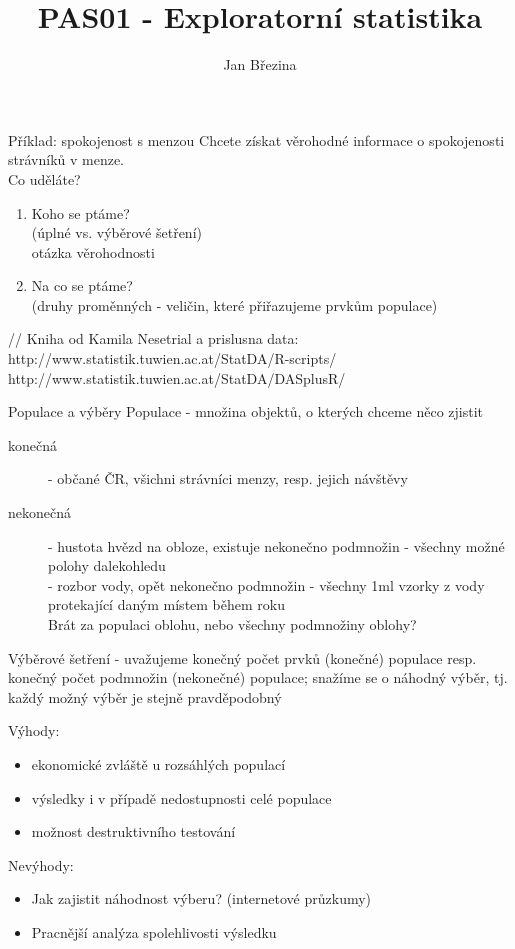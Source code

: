\documentclass[smaller]{beamer}
\title{PAS01 - Exploratorní statistika}
\author{Jan B\v rezina}
\institute %
{
  Technical University of Liberec
}
\def\blue#1{{\usebeamercolor[fg]{my blue} #1}}
\begin{document}
\begin{frame}
  \titlepage
\end{frame}

\def\df{\usebeamercolor[fg]{my red}\it}
\begin{frame}{Příklad: spokojenost s menzou}
Chcete získat věrohodné informace o spokojenosti strávníků v menze.\\ 
Co uděláte? 

\pause
\begin{enumerate}
\item Koho se ptáme? \\
      \pause (úplné vs. výběrové šetření)\\
      \pause otázka věrohodnosti 
      
\item Na co se ptáme? \\
      \pause (druhy proměnných - veličin, které přiřazujeme prvkům populace)
\end{enumerate}

// Kniha od Kamila Nesetrial a prislusna data:
http://www.statistik.tuwien.ac.at/StatDA/R-scripts/
http://www.statistik.tuwien.ac.at/StatDA/DASplusR/

\end{frame}


\begin{frame}{Populace a výběry}
\blue{Populace} - množina objektů, o kterých chceme něco zjistit 
\begin{description}
\item[konečná] - občané ČR, všichni strávníci menzy, resp. jejich návštěvy
\item[nekonečná] - hustota hvězd na obloze, existuje nekonečno podmnožin - všechny možné polohy dalekohledu\\
  - rozbor vody, opět nekonečno podmnožin - všechny 1ml vzorky z vody protekající daným místem během roku\\
  Brát za populaci oblohu, nebo všechny podmnožiny oblohy?
\end{description}

\blue{Výběrové šetření} - uvažujeme konečný počet prvků (konečné) populace resp. konečný počet podmnožin (nekonečné) populace;
                          snažíme se o \blue{náhodný výběr}, tj. každý možný výběr je stejně pravděpodobný
                          

Výhody:
\begin{itemize}
\item ekonomické zvláště u rozsáhlých populací
\item výsledky i v případě nedostupnosti celé populace
\item možnost destruktivního testování
\end{itemize}
Nevýhody:
\begin{itemize}
\item Jak zajistit náhodnost výberu? (internetové průzkumy)
\item Pracnější analýza spolehlivosti výsledku
\end{itemize}
\end{frame}
\end{document}
